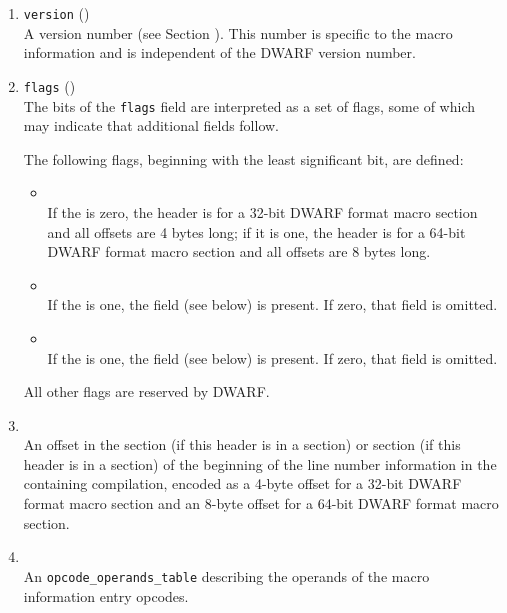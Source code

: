 \begin{enumerate}[1. ]
\item \texttt{version} (\HFTuhalf) \\
A version number (see Section ).
This number is specific to the macro information and is independent
of the DWARF version number.

\item \texttt{flags} (\HFTubyte) \\
The bits of the \texttt{flags} field are interpreted as a set
of flags, some of which may indicate that additional fields follow.

The following flags, beginning with the least significant bit, are defined:
\begin{itemize}
\item \HFNoffsetsizeflag \\
If the \HFNoffsetsizeflag{} is zero, the header is for a 32-bit 
DWARF format macro section and all offsets are 4 bytes long;
if it is one, the header is for a 64-bit DWARF format macro section 
and all offsets are 8 bytes long.

\item {} \\
If the  is one, 
the  field (see below) is present. 
If zero, that field is omitted.

\item {} \\
If the  is one,
the  field (see below) is present.
If zero, that field is omitted.

\end{itemize}
All other flags are reserved by DWARF.

\item {} \\
An offset in the \dotdebugline{} section 
\bb
(if this header is in a \dotdebugmacro{} section) or \dotdebuglinedwo{} 
section (if this header is in a \dotdebugmacrodwo{} section)
\eb
of the beginning of the line number information in the containing
compilation, encoded as a 4-byte offset for a 32-bit DWARF 
format macro section and an 8-byte offset for a 64-bit DWARF format
macro section.  

\item {} \\
An \texttt{opcode\_operands\_table} describing the operands 
of the macro information entry opcodes.


\end{enumerate}
